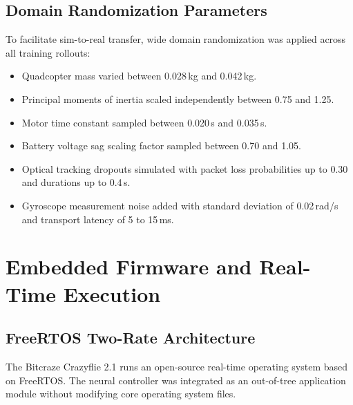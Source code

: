 \documentclass[11pt,a4paper]{article}
\begin{document}
\subsection{Domain Randomization Parameters}
To facilitate sim-to-real transfer, wide domain randomization was applied across all training rollouts:
\begin{itemize}[leftmargin=*,itemsep=2pt]
  \item Quadcopter mass varied between 0.028\,kg and 0.042\,kg.
  \item Principal moments of inertia scaled independently between 0.75 and 1.25.
  \item Motor time constant sampled between 0.020\,s and 0.035\,s.
  \item Battery voltage sag scaling factor sampled between 0.70 and 1.05.
  \item Optical tracking dropouts simulated with packet loss probabilities up to 0.30 and durations up to 0.4\,s.
  \item Gyroscope measurement noise added with standard deviation of 0.02\,rad/s and transport latency of 5 to 15\,ms.
\end{itemize}

\section{Embedded Firmware and Real-Time Execution}
\label{sec:firmware}

\subsection{FreeRTOS Two-Rate Architecture}
The Bitcraze Crazyflie 2.1 runs an open-source real-time operating system based on FreeRTOS. The neural controller was integrated as an out-of-tree application module without modifying core operating system files.
\end{document}
